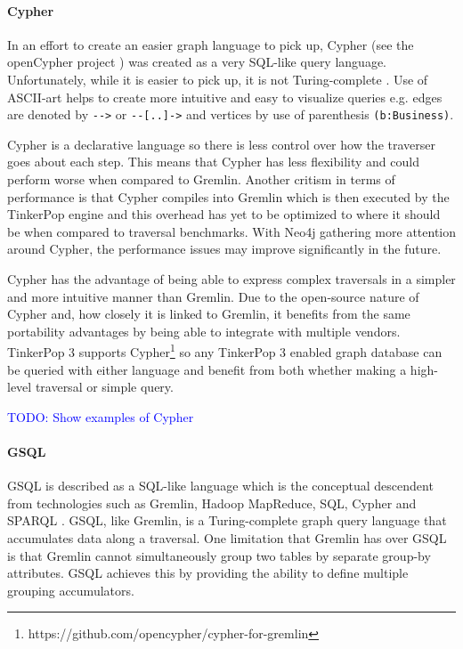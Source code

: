\paragraph{Cypher}

In an effort to create an easier graph language to pick up, Cypher (see the openCypher project \cite{opencypher}) was created as a very SQL-like query language. Unfortunately, while it is easier to pick up, it is not Turing-complete \cite{modern-graph-query-lang}. Use of ASCII-art helps to create more intuitive and easy to visualize queries e.g. edges are denoted by \verb|-->| or \verb|--[..]->| and vertices by use of parenthesis \verb|(b:Business)|.

Cypher is a declarative language so there is less control over how the traverser goes about each step. This means that Cypher has less flexibility and could perform worse when compared to Gremlin. Another critism in terms of performance is that Cypher compiles into Gremlin which is then executed by the TinkerPop engine \cite{backtothefuture} and this overhead has yet to be optimized to where it should be when compared to traversal benchmarks. With Neo4j gathering more attention around Cypher, the performance issues may improve significantly in the future.

Cypher has the advantage of being able to express complex traversals in a simpler and more intuitive manner than Gremlin. Due to the open-source nature of Cypher and, how closely it is linked to Gremlin, it benefits from the same portability advantages by being able to integrate with multiple vendors. TinkerPop 3 supports Cypher\footnote{https://github.com/opencypher/cypher-for-gremlin} so any TinkerPop 3 enabled graph database can be queried with either language and benefit from both whether making a high-level traversal or simple query.

\textcolor{blue}{TODO: Show examples of Cypher}

\paragraph{GSQL}

GSQL is described as a SQL-like language which is the conceptual descendent from technologies such as Gremlin, Hadoop MapReduce, SQL, Cypher and SPARQL \cite{gsql-tigergraph}. GSQL, like Gremlin, is a Turing-complete graph query language that accumulates data along a traversal. One limitation that Gremlin has over GSQL is that Gremlin cannot simultaneously group two tables by separate group-by attributes. GSQL achieves this by providing the ability to define multiple grouping accumulators.

